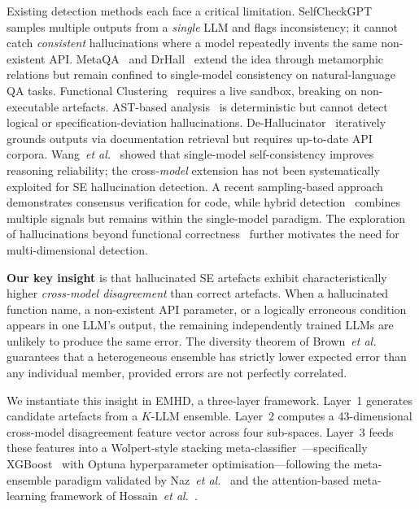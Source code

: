 \documentclass[runningheads]{llncs}
\newcommand{\method}{\textsc{EMHD}}
\newcommand{\etal}{\textit{et al.}}
\begin{document}
Existing detection methods each face a critical limitation. SelfCheckGPT~\cite{manakul2023selfcheckgpt} samples multiple outputs from a \emph{single} LLM and flags inconsistency; it cannot catch \emph{consistent} hallucinations where a model repeatedly invents the same non-existent API. MetaQA~\cite{yang2025metaqa} and DrHall~\cite{wu2025drhall} extend the idea through metamorphic relations but remain confined to single-model consistency on natural-language QA tasks. Functional Clustering~\cite{ravuri2025clustering} requires a live sandbox, breaking on non-executable artefacts. AST-based analysis~\cite{khati2026ast} is deterministic but cannot detect logical or specification-deviation hallucinations. De-Hallucinator~\cite{eghbali2024dehallucinator} iteratively grounds outputs via documentation retrieval but requires up-to-date API corpora. Wang~\etal~\cite{wang2023selfconsistency} showed that single-model self-consistency improves reasoning reliability; the cross-\emph{model} extension has not been systematically exploited for SE hallucination detection. A recent sampling-based approach~\cite{sun2025sampling} demonstrates consensus verification for code, while hybrid detection~\cite{li2025hybrid} combines multiple signals but remains within the single-model paradigm. The exploration of hallucinations beyond functional correctness~\cite{liu2025beyond} further motivates the need for multi-dimensional detection.

\textbf{Our key insight} is that hallucinated SE artefacts exhibit characteristically higher \emph{cross-model disagreement} than correct artefacts. When a hallucinated function name, a non-existent API parameter, or a logically erroneous condition appears in one LLM's output, the remaining independently trained LLMs are unlikely to produce the same error. The diversity theorem of Brown~\etal~\cite{brown2005diversity} guarantees that a heterogeneous ensemble has strictly lower expected error than any individual member, provided errors are not perfectly correlated.

We instantiate this insight in \method{}, a three-layer framework. Layer~1 generates candidate artefacts from a $K$-LLM ensemble. Layer~2 computes a 43-dimensional cross-model disagreement feature vector across four sub-spaces. Layer~3 feeds these features into a Wolpert-style stacking meta-classifier~\cite{wolpert1992stacking}---specifically XGBoost~\cite{chen2016xgboost} with Optuna hyperparameter optimisation---following the meta-ensemble paradigm validated by Naz~\etal~\cite{naz2025metaensemble} and the attention-based meta-learning framework of Hossain~\etal~\cite{hossain2025attention}.
\end{document}
